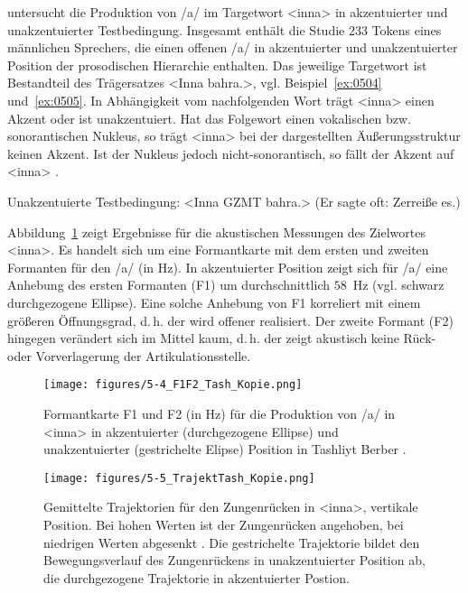 \citet{Diercks2011} untersucht die Produktion von /a/ im Targetwort <inna> in akzentuierter und unakzentuierter Testbedingung. Insgesamt enthält die Studie 233 Tokens eines männlichen Sprechers, die einen offenen  /a/ in akzentuierter und unakzentuierter Position der prosodischen Hierarchie enthalten. Das jeweilige Targetwort ist Bestandteil des Trägersatzes <Inna \longrule bahra.>, vgl. Beispiel~\ref{ex:0504} und~\ref{ex:0505}. In Abhängigkeit vom nachfolgenden Wort trägt <inna> einen Akzent oder ist unakzentuiert. Hat das Folgewort einen vokalischen bzw. sonorantischen Nukleus, so trägt <inna> bei der dargestellten Äußerungsstruktur keinen Akzent. Ist der Nukleus jedoch nicht-sonorantisch, so fällt der Akzent auf <inna> \citep[vgl. die tonale Analyse von][]{Grice2011}.

\begin{exe}
	\ex Unakzentuierte Testbedingung:\label{ex:0504}
	\sn <Inna GZMT bahra.>
	\sn (Er sagte oft: Zerreiße es.)
\end{exe}


Abbildung~\ref{figure:0504} zeigt Ergebnisse für die akustischen Messungen des Zielwortes <inna>. Es handelt sich um eine Formantkarte mit dem ersten und zweiten Formanten für den  /a/ (in Hz). In akzentuierter Position zeigt sich für /a/ eine Anhebung des ersten Formanten (F1) um durchschnittlich  $58$~Hz (vgl. schwarz durchgezogene Ellipse). Eine solche Anhebung von F1 korreliert mit einem größeren Öffnungsgrad, d.\,h. der  wird offener realisiert. Der zweite Formant (F2) hingegen verändert sich im Mittel kaum, d.\,h. der  zeigt akustisch keine Rück- oder Vorverlagerung der Artikulationsstelle.


\begin{figure}
	\texttt{[image: figures/5-4\_F1F2\_Tash\_Kopie.png]}
	\caption{Formantkarte F1 und F2 (in Hz) für die Produktion von /a/ in <inna> in akzentuierter (durchgezogene Ellipse) und unakzentuierter (gestrichelte Elipse) Position in Tashliyt Berber \citep[nach][]{Diercks2011}.}
	\label{figure:0504}
\end{figure}

\begin{figure}
	\texttt{[image: figures/5-5\_TrajektTash\_Kopie.png]}
	\caption{Gemittelte Trajektorien für den Zungenrücken in <inna>, vertikale Position. Bei hohen Werten ist der Zungenrücken angehoben, bei niedrigen Werten abgesenkt \citep[nach][]{Diercks2011}. Die gestrichelte Trajektorie bildet den Bewegungsverlauf des Zungenrückens in unakzentuierter Position ab, die durchgezogene Trajektorie in akzentuierter Postion.}
	\label{figure:0505}
\end{figure}


